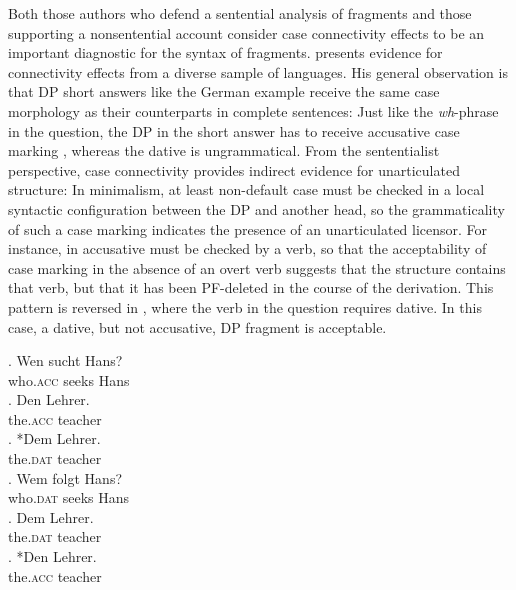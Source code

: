 Both those authors who defend a sentential analysis of fragments and those supporting a nonsentential account consider case connectivity effects to be an important diagnostic for the syntax of fragments. \citet[676--679]{merchant2004} presents evidence for connectivity effects from a diverse sample of languages. His general observation is that DP short answers like the German example \Next receive the same case morphology as their counterparts in complete sentences: Just like the \textit{wh}-phrase in the question, the DP in the short answer has to receive accusative case marking \Next[a], whereas the dative \Next[b] is ungrammatical. From the sententialist perspective, case connectivity provides indirect evidence for unarticulated structure: In minimalism, at least non-default case must be checked in a local syntactic configuration between the DP and another head, so the grammaticality of such a case marking indicates the presence of an unarticulated licensor. For instance, in \Next[a] accusative must be checked by a verb, so that the acceptability of case marking in the absence of an overt verb suggests that the structure contains that verb, but that it has been PF-deleted in the course of the derivation. This pattern is reversed in \NNext, where the verb in the question requires dative. In this case, a dative, but not accusative, DP fragment is acceptable.

\exg. Wen sucht Hans?\label{ex:merchant.caseconn-acc}\\
who.\textsc{acc} seeks Hans\\
 \hfill {}
\ag. Den Lehrer.\label{ex:merchant.caseconn-acc-subex}\\ 
the.\textsc{acc} teacher \mbox{}\\
\bg. *Dem Lehrer.\\
the.\textsc{dat} teacher\\

\exg. Wem folgt Hans?\label{ex:merchant.caseconn-dat}\\
who.\textsc{dat} seeks Hans\\
 \hfill {}
\ag. Dem Lehrer. \label{ex:merchant.caseconn-dat-subex}\\ 
the.\textsc{dat} teacher\\
\bg. *Den Lehrer.\\
the.\textsc{acc} teacher\\

